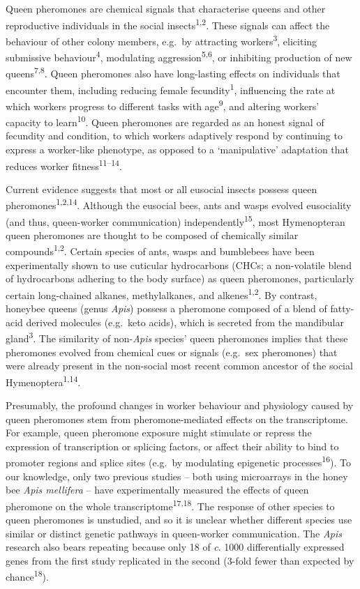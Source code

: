 \documentclass[12pt,]{article}
\begin{document}
Queen pheromones are chemical signals that characterise queens and other
reproductive individuals in the social insects\textsuperscript{1,2}.
These signals can affect the behaviour of other colony members, e.g.~by
attracting workers\textsuperscript{3}, eliciting submissive
behaviour\textsuperscript{4}, modulating
aggression\textsuperscript{5,6}, or inhibiting production of new
queens\textsuperscript{7,8}. Queen pheromones also have long-lasting
effects on individuals that encounter them, including reducing female
fecundity\textsuperscript{1}, influencing the rate at which workers
progress to different tasks with age\textsuperscript{9}, and altering
workers' capacity to learn\textsuperscript{10}. Queen pheromones are
regarded as an honest signal of fecundity and condition, to which
workers adaptively respond by continuing to express a worker-like
phenotype, as opposed to a `manipulative' adaptation that reduces worker
fitness\textsuperscript{11--14}.

Current evidence suggests that most or all eusocial insects possess
queen pheromones\textsuperscript{1,2,14}. Although the eusocial bees,
ants and wasps evolved eusociality (and thus, queen-worker
communication) independently\textsuperscript{15}, most Hymenopteran
queen pheromones are thought to be composed of chemically similar
compounds\textsuperscript{1,2}. Certain species of ants, wasps and
bumblebees have been experimentally shown to use cuticular hydrocarbons
(CHCs; a non-volatile blend of hydrocarbons adhering to the body
surface) as queen pheromones, particularly certain long-chained alkanes,
methylalkanes, and alkenes\textsuperscript{1,2}. By contrast, honeybee
queens (genus \emph{Apis}) possess a pheromone composed of a blend of
fatty-acid derived molecules (e.g.~keto acids), which is secreted from
the mandibular gland\textsuperscript{3}. The similarity of
non-\emph{Apis} species' queen pheromones implies that these pheromones
evolved from chemical cues or signals (e.g.~sex pheromones) that were
already present in the non-social most recent common ancestor of the
social Hymenoptera\textsuperscript{1,14}.

Presumably, the profound changes in worker behaviour and physiology
caused by queen pheromones stem from pheromone-mediated effects on the
transcriptome. For example, queen pheromone exposure might stimulate or
repress the expression of transcription or splicing factors, or affect
their ability to bind to promoter regions and splice sites (e.g.~by
modulating epigenetic processes\textsuperscript{16}). To our knowledge,
only two previous studies -- both using microarrays in the honey bee
\emph{Apis mellifera} -- have experimentally measured the effects of
queen pheromone on the whole transcriptome\textsuperscript{17,18}. The
response of other species to queen pheromones is unstudied, and so it is
unclear whether different species use similar or distinct genetic
pathways in queen-worker communication. The \emph{Apis} research also
bears repeating because only 18 of \emph{c}. 1000 differentially
expressed genes from the first study replicated in the second (3-fold
fewer than expected by chance\textsuperscript{18}).
\end{document}
